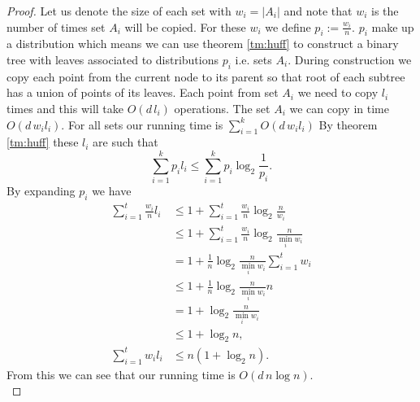 \documentclass{article}
\newtheorem{proof}{Proof}
\begin{document}
\begin{proof}
Let us denote the size of each set with $w_i = |A_i|$ and note that $w_i$ is the number of times set $A_i$ will be copied.
For these $w_i$ we define $p_i := \frac{w_i}{n}$.
$p_i$ make up a distribution which means we can use theorem \ref{tm:huff} to construct a binary tree with leaves associated to distributions $p_i$ i.e. sets $A_i$.
During construction we copy each point from the current node to its parent so that root of each subtree has a union of points of its leaves.
Each point from set $A_i$ we need to copy $l_i$ times and this will take $O(d\, l_i)$ operations.
The set $A_i$ we can copy in time $O(d\, w_il_i)$.
For all sets our running time is $ \sum \limits_{i=1}^k O(d\,w_i l_i)$
 By theorem \ref{tm:huff} these $l_i$ are such that
$$ \sum \limits_{i = 1}^k p_i l_i \leq \sum \limits_{i = 1}^k p_i \log_2 \frac{1}{p_i}. $$
By expanding $p_i$ we have
\begin{align*}
	\sum \limits_{i = 1}^t \frac{w_i}{n} l_i
	&\leq 1 + \sum \limits_{i = 1}^t \frac{w_i}{n} \log_2 \frac{n}{w_i} \\
	&\leq 1 + \sum \limits_{i = 1}^t \frac{w_i}{n}\log_2 \frac{n}{\min \limits_{i} w_i} \\
	&= 1 + \frac{1}{n}\log_2 \frac{n}{\min \limits_i w_i} \sum \limits_{i = 1}^t w_i \\
	&\leq 1 + \frac{1}{n}\log_2 \frac{n}{\min \limits_i w_i} n \\
	&= 1 + \log_2 \frac{n}{\min \limits_i w_i} \\
	&\leq 1 + \log_2 n, \\ 
	\sum \limits_{i=1}^t w_i l_i &\leq n \left(1 + \log_2 n\right).
\end{align*}
From this we can see that our running time is $O\left(d\,n \log n\right)$.\\
\end{proof}
\end{document}
